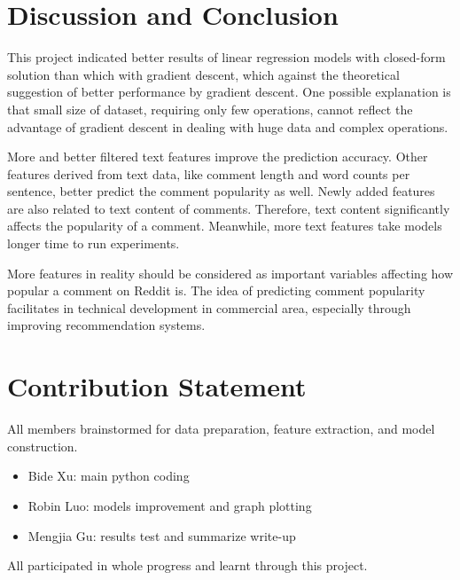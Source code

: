 \documentclass[letterpaper, 11pt]{article}
\begin{document}
\section*{Discussion and Conclusion}

This project indicated better results of linear regression models with closed-form solution than which with gradient descent, which against the theoretical suggestion of better performance by gradient descent. One possible explanation is that small size of dataset, requiring only few operations, cannot reflect the advantage of gradient descent in dealing with huge data and complex operations.

More and better filtered text features improve the prediction accuracy. Other features derived from text data, like comment length and word counts per sentence, better predict the comment popularity as well. Newly added features are also related to text content of comments. Therefore, text content significantly affects the popularity of a comment. Meanwhile, more text features take models longer time to run experiments.

More features in reality should be considered as important variables affecting how popular a comment on Reddit is. The idea of predicting comment popularity facilitates in technical development in commercial area, especially through improving recommendation systems.

\section*{Contribution Statement}

All members brainstormed for data preparation, feature extraction, and model construction.
\begin{itemize}
    \item Bide Xu: main python coding
    \item Robin Luo: models improvement and graph plotting
    \item Mengjia Gu: results test and summarize write-up
\end{itemize}All participated in whole progress and learnt through this project.


\nocite{*}





\begingroup


    
\end{document}
